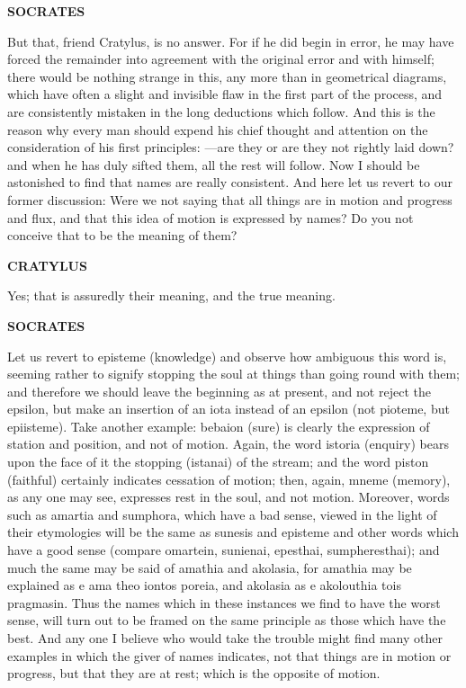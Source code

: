 \documentclass[11pt,letter]{article}
\begin{document}
\par \textbf{SOCRATES}
\par   But that, friend Cratylus, is no answer. For if he did begin in error, he may have forced the remainder into agreement with the original error and with himself; there would be nothing strange in this, any more than in geometrical diagrams, which have often a slight and invisible flaw in the first part of the process, and are consistently mistaken in the long deductions which follow. And this is the reason why every man should expend his chief thought and attention on the consideration of his first principles: —are they or are they not rightly laid down? and when he has duly sifted them, all the rest will follow. Now I should be astonished to find that names are really consistent. And here let us revert to our former discussion:  Were we not saying that all things are in motion and progress and flux, and that this idea of motion is expressed by names? Do you not conceive that to be the meaning of them?

\par \textbf{CRATYLUS}
\par   Yes; that is assuredly their meaning, and the true meaning.

\par \textbf{SOCRATES}
\par   Let us revert to episteme (knowledge) and observe how ambiguous this word is, seeming rather to signify stopping the soul at things than going round with them; and therefore we should leave the beginning as at present, and not reject the epsilon, but make an insertion of an iota instead of an epsilon (not pioteme, but epiisteme). Take another example:  bebaion (sure) is clearly the expression of station and position, and not of motion. Again, the word istoria (enquiry) bears upon the face of it the stopping (istanai) of the stream; and the word piston (faithful) certainly indicates cessation of motion; then, again, mneme (memory), as any one may see, expresses rest in the soul, and not motion. Moreover, words such as amartia and sumphora, which have a bad sense, viewed in the light of their etymologies will be the same as sunesis and episteme and other words which have a good sense (compare omartein, sunienai, epesthai, sumpheresthai); and much the same may be said of amathia and akolasia, for amathia may be explained as e ama theo iontos poreia, and akolasia as e akolouthia tois pragmasin. Thus the names which in these instances we find to have the worst sense, will turn out to be framed on the same principle as those which have the best. And any one I believe who would take the trouble might find many other examples in which the giver of names indicates, not that things are in motion or progress, but that they are at rest; which is the opposite of motion.
\end{document}
